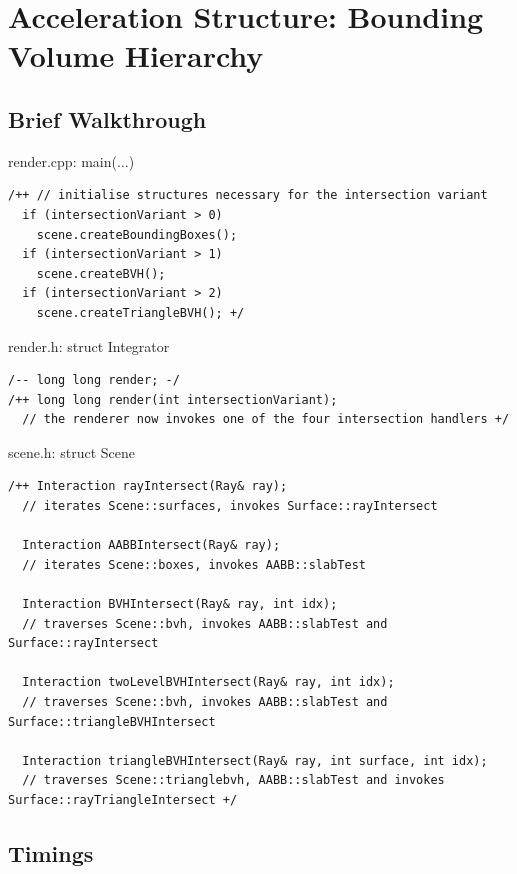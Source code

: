 \documentclass[a4paper]{article}
\begin{document}
\section{Acceleration Structure: Bounding Volume Hierarchy}

\subsection{Brief Walkthrough}

\begin{boxx}{render.cpp: main(...)}
\begin{lstlisting}
/++ // initialise structures necessary for the intersection variant
  if (intersectionVariant > 0)
    scene.createBoundingBoxes();
  if (intersectionVariant > 1)
    scene.createBVH();
  if (intersectionVariant > 2)
    scene.createTriangleBVH(); +/
\end{lstlisting}
\end{boxx}

\begin{boxx}{render.h: struct Integrator}
\begin{lstlisting}
/-- long long render; -/
/++ long long render(int intersectionVariant);
  // the renderer now invokes one of the four intersection handlers +/
\end{lstlisting}
\end{boxx}

\begin{boxx}{scene.h: struct Scene}
\begin{lstlisting}
/++ Interaction rayIntersect(Ray& ray);
  // iterates Scene::surfaces, invokes Surface::rayIntersect

  Interaction AABBIntersect(Ray& ray);
  // iterates Scene::boxes, invokes AABB::slabTest

  Interaction BVHIntersect(Ray& ray, int idx);
  // traverses Scene::bvh, invokes AABB::slabTest and Surface::rayIntersect

  Interaction twoLevelBVHIntersect(Ray& ray, int idx);
  // traverses Scene::bvh, invokes AABB::slabTest and Surface::triangleBVHIntersect

  Interaction triangleBVHIntersect(Ray& ray, int surface, int idx);
  // traverses Scene::trianglebvh, AABB::slabTest and invokes Surface::rayTriangleIntersect +/
\end{lstlisting}
\end{boxx}

\subsection{Timings}
\end{document}
